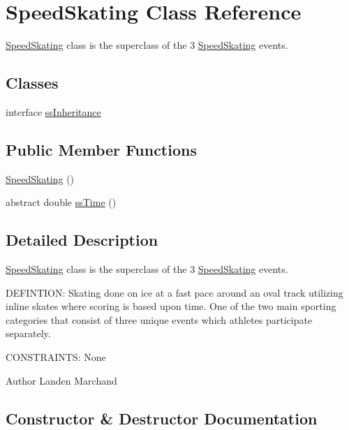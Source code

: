 \hypertarget{classSpeedSkating}{}\section{Speed\+Skating Class Reference}
\label{classSpeedSkating}


\hyperlink{classSpeedSkating}{Speed\+Skating} class is the superclass of the 3 \hyperlink{classSpeedSkating}{Speed\+Skating} events.  


\subsection*{Classes}
\begin{DoxyCompactItemize}
\item 
interface \hyperlink{interfaceSpeedSkating_1_1ssInheritance}{ss\+Inheritance}
\end{DoxyCompactItemize}
\subsection*{Public Member Functions}
\begin{DoxyCompactItemize}
\item 
\hyperlink{classSpeedSkating_a524c8cebe73de77751cbd5fad7441495}{Speed\+Skating} ()
\item 
abstract double \hyperlink{classSpeedSkating_ac0f08d69e63d02979947da25f764f08e}{ss\+Time} ()
\end{DoxyCompactItemize}


\subsection{Detailed Description}
\hyperlink{classSpeedSkating}{Speed\+Skating} class is the superclass of the 3 \hyperlink{classSpeedSkating}{Speed\+Skating} events. 

D\+E\+F\+I\+N\+T\+I\+ON\+: Skating done on ice at a fast pace around an oval track utilizing inline skates where scoring is based upon time. One of the two main sporting categories that consist of three unique events which athletes participate separately.

C\+O\+N\+S\+T\+R\+A\+I\+N\+TS\+: None\begin{DoxyAuthor}{Author}
Landen Marchand 
\end{DoxyAuthor}


\subsection{Constructor \& Destructor Documentation}
\mbox{\label{classSpeedSkating_a524c8cebe73de77751cbd5fad7441495}} 
